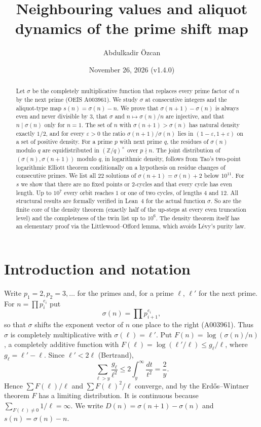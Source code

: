 \documentclass[11pt]{amsart}
\title{Neighbouring values and aliquot dynamics of the prime shift map}
\author{Abdulkadir \"Ozcan}
\date{November 26, 2026 (v1.4.0)}
\theoremstyle{remark}
\newcommand{\s}{\sigma}
\newcommand{\nx}[1]{#1'}
\begin{document}
\begin{abstract}
Let $\s$ be the completely multiplicative function that replaces every prime factor of $n$ by the next prime (OEIS A003961). We study $\s$ at consecutive integers and the aliquot-type map $s(n)=\s(n)-n$. We prove that $\s(n+1)-\s(n)$ is always even and never divisible by $3$, that $\s$ and $n\mapsto \s(n)/n$ are injective, and that $n\mid \s(n)$ only for $n=1$. The set of $n$ with $\s(n+1)>\s(n)$ has natural density exactly $1/2$, and for every $\varepsilon>0$ the ratio $\s(n+1)/\s(n)$ lies in $(1-\varepsilon,1+\varepsilon)$ on a set of positive density. For a prime $p$ with next prime $q$, the residues of $\s(n)$ modulo $q$ are equidistributed in $(\mathbb Z/q)^\times$ over $p\nmid n$. The joint distribution of $(\s(n),\s(n+1))$ modulo $q$, in logarithmic density, follows from Tao's two-point logarithmic Elliott theorem conditionally on a hypothesis on residue changes of consecutive primes. We list all $22$ solutions of $\s(n+1)=\s(n)+2$ below $10^{11}$. For $s$ we show that there are no fixed points or $2$-cycles and that every cycle has even length. Up to $10^7$ every orbit reaches $1$ or one of two cycles, of lengths $4$ and $12$. All structural results are formally verified in Lean~4 for the actual function $\s$. So are the finite core of the density theorem (exactly half of the up-steps at every even truncation level) and the completeness of the twin list up to $10^6$. The density theorem itself has an elementary proof via the Littlewood--Offord lemma, which avoids L\'evy's purity law.
\end{abstract}

\maketitle

\section{Introduction and notation}

Write $p_1=2,p_2=3,\dots$ for the primes and, for a prime $\ell$, $\nx\ell$ for the next prime. For $n=\prod p_i^{e_i}$ put
\[
\s(n)=\prod p_{i+1}^{e_i},
\]
so that $\s$ shifts the exponent vector of $n$ one place to the right (A003961). Thus $\s$ is completely multiplicative with $\s(\ell)=\nx\ell$. Put $F(n)=\log(\s(n)/n)$, a completely additive function with $F(\ell)=\log(\nx\ell/\ell)\le g_\ell/\ell$, where $g_\ell=\nx\ell-\ell$. Since $\nx\ell<2\ell$ (Bertrand),
\begin{equation}\label{eq:tail}
\sum_{\ell>y} \frac{g_\ell}{\ell^2}\le 2\int_y^\infty\frac{dt}{t^2}=\frac 2y .
\end{equation}
Hence $\sum F(\ell)/\ell$ and $\sum F(\ell)^2/\ell$ converge, and by the Erd\H{o}s--Wintner theorem $F$ has a limiting distribution. It is continuous because $\sum_{F(\ell)\neq0}1/\ell=\infty$. We write $D(n)=\s(n+1)-\s(n)$ and $s(n)=\s(n)-n$.
\end{document}

